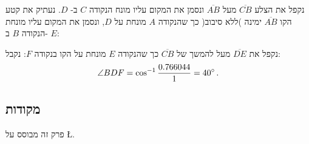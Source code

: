 נקפל את הצלע
$\overline{CB}$
מעל 
$\overline{AB}$
ונסמן את המקום עליו מונח הנקודה
$C$
ב-%
$D$.
נעתיק את קטע הקו
$\overline{AB}$ 
ימינה )ללא סיבוב( כך שהנקודה
$A$
מונחת על
$D$,
ונסמן את המקום עליו מונחת הנקודה 
$B$
ב-%
$E$:

%

נקפל את 
$\overline{DE}$
מעל להמשך של 
$\overline{CB}$
כך שהנקודה
$E$
מונחת על הקו בנקודה
$F$:
%
נקבל:
\[
\angle BDF=\cos^{-1} \displaystyle\frac{0.766044}{1}=40^\circ\,.
\]



\subsection*{מקודות}

פרק זה מבוסס על
\L{\cite{alperin,lang,martin,newton}}.
